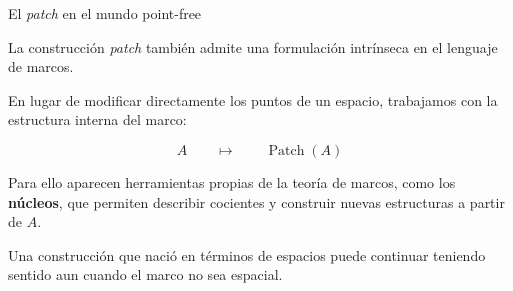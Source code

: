 \documentclass[compress,12pt]{beamer}
\begin{document}
\begin{frame}{El \textit{patch} en el mundo point-free}
\small

La construcción \textit{patch} también admite una formulación
intrínseca en el lenguaje de marcos.

\pause

\medskip

En lugar de modificar directamente los puntos de un espacio,
trabajamos con la estructura interna del marco:

\[
\boxed{
A
\qquad\longmapsto\qquad
\operatorname{Patch}(A)
}
\]

\pause

\medskip

Para ello aparecen herramientas propias de la teoría de marcos,
como los \textbf{núcleos}, que permiten describir cocientes
y construir nuevas estructuras a partir de $A$.

\pause

\vfill

\begin{block}{}
\centering
Una construcción que nació en términos de espacios
puede continuar teniendo sentido aun cuando
el marco no sea espacial.
\end{block}

\end{frame}
\end{document}
